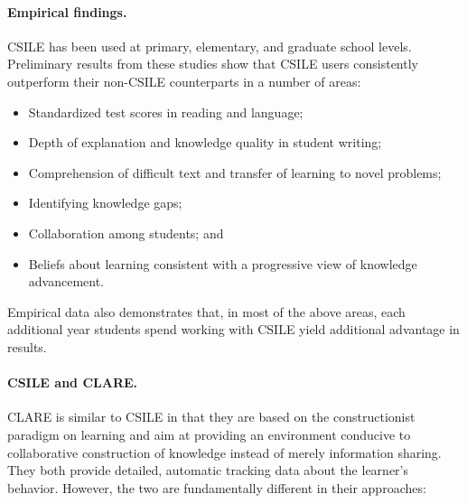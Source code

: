 \paragraph{Empirical findings.}

CSILE has been used at primary, elementary, and graduate school levels.
Preliminary results from these studies show that CSILE users consistently
outperform their non-CSILE counterparts in a number of areas:

\begin{itemize}
\item Standardized test scores in reading and language;
  
\item Depth of explanation and knowledge quality in student writing;
  
\item Comprehension of difficult text and transfer of learning to novel problems;
  
\item Identifying knowledge gaps;

\item Collaboration among students; and
  
\item Beliefs about learning consistent with a progressive view of
  knowledge advancement.
\end{itemize}

Empirical data also demonstrates that, in most of the above
areas, each additional year students spend working with CSILE yield
additional advantage in results. 


\paragraph{CSILE and CLARE.}

CLARE is similar to CSILE in that they are based on the constructionist
paradigm on learning and aim at providing an environment conducive to
collaborative construction of knowledge instead of merely information
sharing.  They both provide detailed, automatic tracking data about the
learner's behavior. However, the two are fundamentally different in their
approaches:

